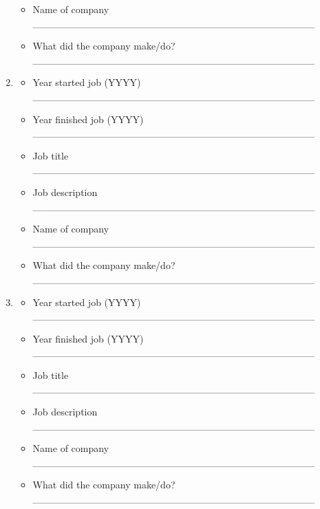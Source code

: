 \documentclass[a4paper,10pt]{article}
\begin{document}
\begin{enumerate}
\begin{itemize}
         \item Name of company \_\_\_\_\_\_\_\_\_\_\_\_\_\_\_\_\_\_\_\_\_\_\_\_\_\_\_\_\_\_\_\_\_\_\_\_\_\_\_
         \item What did the company make/do? \_\_\_\_\_\_\_\_\_\_\_\_\_\_\_\_\_\_\_\_\_\_\_\_\_\_\_\_\_\_\_\_\_\_\_\_\_\_\_
      \end{itemize}
 \item
     \begin{itemize}
         \item Year started job (YYYY) \_\_\_\_\_\_\_\_\_\_\_\_\_\_\_\_\_\_\_\_\_\_\_\_\_\_\_\_\_\_\_\_\_\_\_\_\_\_\_ 
         \item Year finished job (YYYY) \_\_\_\_\_\_\_\_\_\_\_\_\_\_\_\_\_\_\_\_\_\_\_\_\_\_\_\_\_\_\_\_\_\_\_\_\_\_\_
         \item Job title \_\_\_\_\_\_\_\_\_\_\_\_\_\_\_\_\_\_\_\_\_\_\_\_\_\_\_\_\_\_\_\_\_\_\_\_\_\_\_
         \item Job description \_\_\_\_\_\_\_\_\_\_\_\_\_\_\_\_\_\_\_\_\_\_\_\_\_\_\_\_\_\_\_\_\_\_\_\_\_\_\_
         \item Name of company \_\_\_\_\_\_\_\_\_\_\_\_\_\_\_\_\_\_\_\_\_\_\_\_\_\_\_\_\_\_\_\_\_\_\_\_\_\_\_
         \item What did the company make/do? \_\_\_\_\_\_\_\_\_\_\_\_\_\_\_\_\_\_\_\_\_\_\_\_\_\_\_\_\_\_\_\_\_\_\_\_\_\_\_
      \end{itemize}
 \item
     \begin{itemize}
         \item Year started job (YYYY) \_\_\_\_\_\_\_\_\_\_\_\_\_\_\_\_\_\_\_\_\_\_\_\_\_\_\_\_\_\_\_\_\_\_\_\_\_\_\_ 
         \item Year finished job (YYYY) \_\_\_\_\_\_\_\_\_\_\_\_\_\_\_\_\_\_\_\_\_\_\_\_\_\_\_\_\_\_\_\_\_\_\_\_\_\_\_
         \item Job title \_\_\_\_\_\_\_\_\_\_\_\_\_\_\_\_\_\_\_\_\_\_\_\_\_\_\_\_\_\_\_\_\_\_\_\_\_\_\_
         \item Job description \_\_\_\_\_\_\_\_\_\_\_\_\_\_\_\_\_\_\_\_\_\_\_\_\_\_\_\_\_\_\_\_\_\_\_\_\_\_\_
         \item Name of company \_\_\_\_\_\_\_\_\_\_\_\_\_\_\_\_\_\_\_\_\_\_\_\_\_\_\_\_\_\_\_\_\_\_\_\_\_\_\_
         \item What did the company make/do? \_\_\_\_\_\_\_\_\_\_\_\_\_\_\_\_\_\_\_\_\_\_\_\_\_\_\_\_\_\_\_\_\_\_\_\_\_\_\_
      \end{itemize}
 \end{enumerate}
\end{document}
